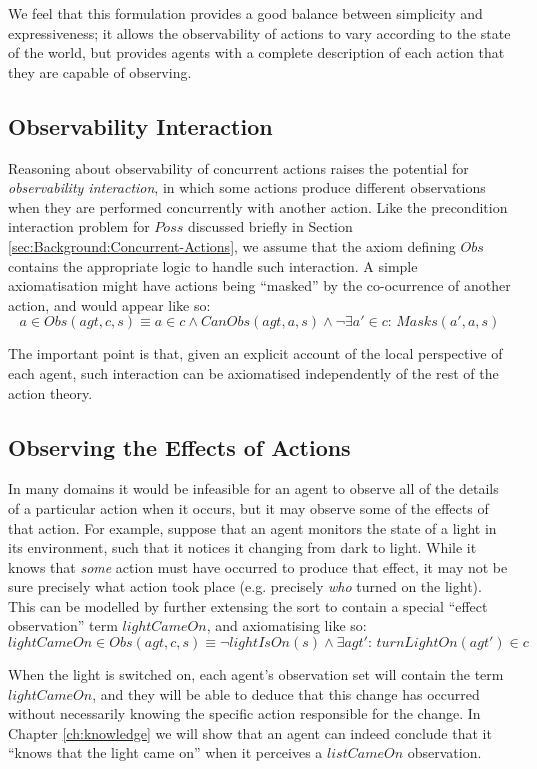 We feel that this formulation provides a good balance between simplicity
and expressiveness; it allows the observability of actions to vary
according to the state of the world, but provides agents with a complete
description of each action that they are capable of observing.


\subsection{Observability Interaction}

Reasoning about observability of concurrent actions raises the potential
for \emph{observability interaction}, in which some actions produce
different observations when they are performed concurrently with another
action. Like the precondition interaction problem for $Poss$ discussed
briefly in Section \ref{sec:Background:Concurrent-Actions}, we assume
that the axiom defining $Obs$ contains the appropriate logic to handle
such interaction. A simple axiomatisation might have actions being
{}``masked'' by the co-ocurrence of another action, and would appear
like so:\[
a\in Obs(agt,c,s)\equiv a\in c\wedge CanObs(agt,a,s)\wedge\neg\exists a'\in c:\, Masks(a',a,s)\]


The important point is that, given an explicit account of the local
perspective of each agent, such interaction can be axiomatised independently
of the rest of the action theory.


\subsection{Observing the Effects of Actions}

In many domains it would be infeasible for an agent to observe all
of the details of a particular action when it occurs, but it may observe
some of the effects of that action. For example, suppose that an agent
monitors the state of a light in its environment, such that it notices
it changing from dark to light. While it knows that \emph{some} action
must have occurred to produce that effect, it may not be sure precisely
what action took place (e.g. precisely \emph{who} turned on the light).
This can be modelled by further extensing the  sort
to contain a special {}``effect observation'' term $lightCameOn$,
and axiomatising like so:\[
lightCameOn\in Obs(agt,c,s)\equiv\neg lightIsOn(s)\wedge\exists agt':\, turnLightOn(agt')\in c\]


When the light is switched on, each agent's observation set will contain
the term $lightCameOn$, and they will be able to deduce that this
change has occurred without necessarily knowing the specific action
responsible for the change. In Chapter \ref{ch:knowledge} we will
show that an agent can indeed conclude that it {}``knows that the
light came on'' when it perceives a $listCameOn$ observation.



